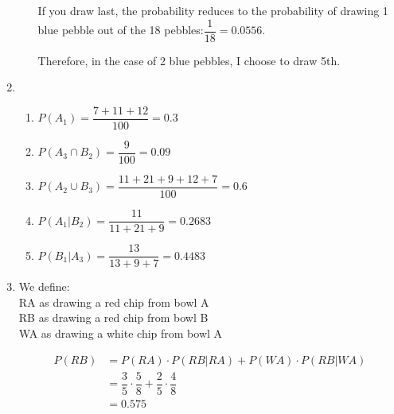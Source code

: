 \documentclass{article}
\begin{document}
\begin{enumerate}
\begin{enumerate}
	      If you draw last, the probability reduces to the probability of drawing 1 blue pebble
	      out of the 18 pebbles:$\dfrac{1}{18} = 0.0556$. 
	      
	      Therefore, in the case of 2 blue pebbles, I choose to draw 5th. 
	  \end{enumerate}
	  \addtocounter{enumi}{1}
	  
	\item 
	  \begin{enumerate}
	   \item $P(A_1) = \dfrac{7+11+12}{100} = 0.3$
	   \item $P(A_3 \cap B_2) = \dfrac{9}{100} = 0.09$
	   \item $P(A_2 \cup B_3) = \dfrac{11+21+9+12+7}{100} = 0.6$
	   \item $P(A_1 | B_2) = \dfrac{11}{11+21+9} = 0.2683$
	   \item $P(B_1 | A_3) = \dfrac{13}{13+9+7} = 0.4483$
	  \end{enumerate}
	  \addtocounter{enumi}{1}
	  
	\item 
	  We define:\\
	    RA as drawing a red chip from bowl A \\
	    RB as drawing a red chip from bowl B \\
	    WA as drawing a white chip from bowl A 
	    
	  \begin{align*}
	    P(RB) &= P(RA)\cdot P(RB|RA) + P(WA)\cdot P(RB|WA) \\
		  &= \dfrac{3}{5}\cdot\dfrac{5}{8} + \dfrac{2}{5}\cdot\dfrac{4}{8} \\
		  &= 0.575
	  \end{align*}

      \end{enumerate}
 
\end{document}
